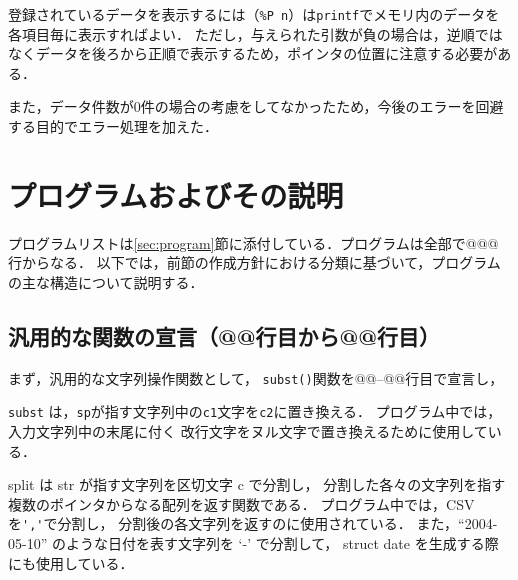 \documentclass[a4j,11pt]{jarticle}
\begin{document}
登録されているデータを表示するには（\verb|%P n|）は\verb|printf|でメモリ内のデータを各項目毎に表示すればよい．
ただし，与えられた引数が負の場合は，逆順ではなくデータを後ろから正順で表示するため，ポインタの位置に注意する必要がある．

また，データ件数が0件の場合の考慮をしてなかったため，今後のエラーを回避する目的でエラー処理を加えた．

\section{プログラムおよびその説明}



プログラムリストは\ref{sec:program}節に添付している．プログラムは全部で@@@行からなる．
以下では，前節の作成方針における分類に基づいて，プログラムの主な構造について説明する．

\subsection{汎用的な関数の宣言（@@行目から@@行目）}

まず，汎用的な文字列操作関数として，
\verb|subst()|関数を@@--@@行目で宣言し， %

\verb|subst| は，\verb|sp|が指す文字列中の\verb|c1|文字を\verb|c2|に置き換える．
プログラム中では，入力文字列中の末尾に付く
改行文字をヌル文字で置き換えるために使用している．

split は str が指す文字列を区切文字 c で分割し，
分割した各々の文字列を指す複数のポインタからなる配列を返す関数である．
プログラム中では，CSVを\verb|','|で分割し，
分割後の各文字列を返すのに使用されている．
また，``2004-05-10'' のような日付を表す文字列を `-' で分割して，
struct date を生成する際にも使用している．
\end{document}
